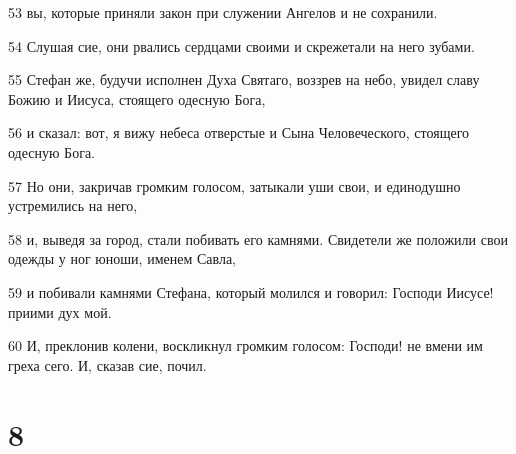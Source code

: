 \par 53 вы, которые приняли закон при служении Ангелов и не сохранили.
\par 54 Слушая сие, они рвались сердцами своими и скрежетали на него зубами.
\par 55 Стефан же, будучи исполнен Духа Святаго, воззрев на небо, увидел славу Божию и Иисуса, стоящего одесную Бога,
\par 56 и сказал: вот, я вижу небеса отверстые и Сына Человеческого, стоящего одесную Бога.
\par 57 Но они, закричав громким голосом, затыкали уши свои, и единодушно устремились на него,
\par 58 и, выведя за город, стали побивать его камнями. Свидетели же положили свои одежды у ног юноши, именем Савла,
\par 59 и побивали камнями Стефана, который молился и говорил: Господи Иисусе! приими дух мой.
\par 60 И, преклонив колени, воскликнул громким голосом: Господи! не вмени им греха сего. И, сказав сие, почил.

\chapter{8}

